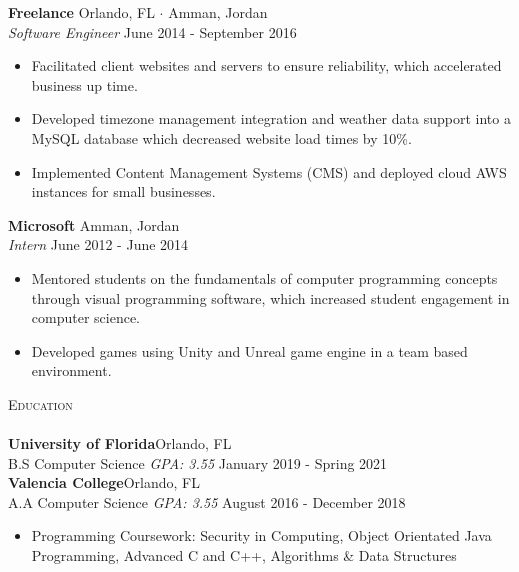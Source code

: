 \documentclass[a4paper]{article}
\newcommand{\lineunder} {
    \vspace*{-8pt} \\
    \hspace*{-18pt} \hrulefill \\
}
\newcommand{\header} [1] {
    {\hspace*{-18pt}\vspace*{6pt} \textsc{#1}}
    \vspace*{-6pt} \lineunder
}
\begin{document}
\textbf{Freelance} \hfill Orlando, FL $\cdot$  Amman, Jordan\\
\textit{Software Engineer} \hfill June 2014 - September 2016\\
\vspace{-1mm}
\begin{itemize} \itemsep 1pt
	\item Facilitated client websites and servers to ensure reliability, which accelerated business up time.
	\item Developed timezone management integration and weather data support into a MySQL database which decreased website load times by 10\%.
	\item Implemented Content Management Systems (CMS) and deployed cloud AWS instances for small businesses.
\end{itemize}

\textbf{Microsoft} \hfill Amman, Jordan\\
\textit{Intern} \hfill June 2012 - June 2014\\
\vspace{-1mm}
\begin{itemize} \itemsep 1pt
	\item Mentored students on the fundamentals of computer programming concepts through visual
programming software, which increased student engagement in computer science.
	\item Developed games using Unity and Unreal game engine in a team based environment.
\end{itemize}

\header{Education}
\textbf{University of Florida}\hfill Orlando, FL\\
B.S Computer Science
\textit{GPA: 3.55} \hfill January 2019 - Spring 2021\\
\vspace{2mm}
\textbf{Valencia College}\hfill Orlando, FL\\
A.A Computer Science \textit{GPA: 3.55} \hfill August 2016 - December 2018\\
\vspace{2mm}
\begin{itemize} \itemsep 1pt
	\item Programming Coursework: Security in Computing, Object Orientated Java Programming, Advanced C and C++, Algorithms \& Data Structures
\end{itemize}

\end{document}
